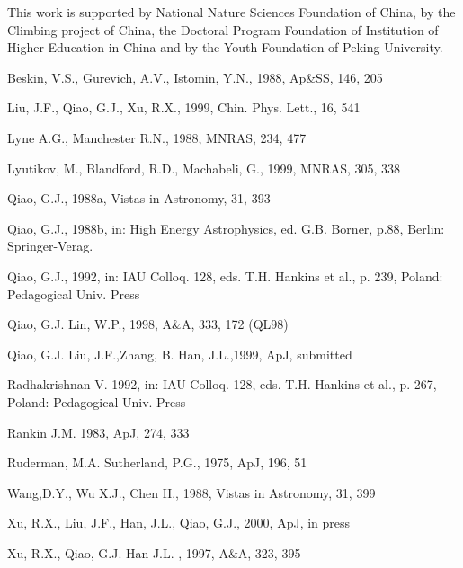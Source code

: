\begin{acknowledgments}
This work is supported by National Nature Sciences Foundation of
China, by the Climbing project of China, the Doctoral Program
Foundation of Institution of Higher Education in China and by the
Youth Foundation of Peking University.
\end{acknowledgments}


\begin{thebibliography}{}

\bibitem{} Beskin, V.S., Gurevich, A.V., Istomin, Y.N., 1988,
    Ap\&SS, 146, 205

\bibitem{} Liu, J.F., Qiao, G.J., Xu, R.X., 1999,
    Chin. Phys. Lett., 16, 541

\bibitem{} Lyne A.G., Manchester R.N., 1988,
    MNRAS, 234, 477

\bibitem{} Lyutikov, M., Blandford, R.D., Machabeli, G., 1999,
    MNRAS, 305, 338

\bibitem{} Qiao, G.J., 1988a,
    Vistas in Astronomy, 31, 393

\bibitem{} Qiao, G.J., 1988b, in: High Energy Astrophysics, ed. G.B. Borner,
  p.88, Berlin: Springer-Verag.

\bibitem{} Qiao, G.J., 1992, in: IAU Colloq. 128, eds. T.H. Hankins et al.,
p. 239, Poland: Pedagogical Univ. Press

\bibitem{} Qiao, G.J. Lin, W.P., 1998,
    A\&A, 333, 172 (QL98)

\bibitem{} Qiao, G.J. Liu, J.F.,Zhang, B. Han, J.L.,1999,
    ApJ, submitted

\bibitem{} Radhakrishnan V. 1992, in: IAU Colloq. 128, eds.
T.H. Hankins et al., p. 267, Poland: Pedagogical Univ. Press

\bibitem{} Rankin J.M. 1983,
    ApJ, 274, 333

\bibitem{} Ruderman, M.A. Sutherland, P.G., 1975,
    ApJ, 196, 51

\bibitem{} Wang,D.Y., Wu X.J., Chen H., 1988,
    Vistas in Astronomy, 31, 399

\bibitem{} Xu, R.X., Liu, J.F., Han, J.L., Qiao, G.J., 2000,
    ApJ, in press

\bibitem{} Xu, R.X., Qiao, G.J. Han J.L. , 1997,
    A\&A, 323, 395

\end{thebibliography}


